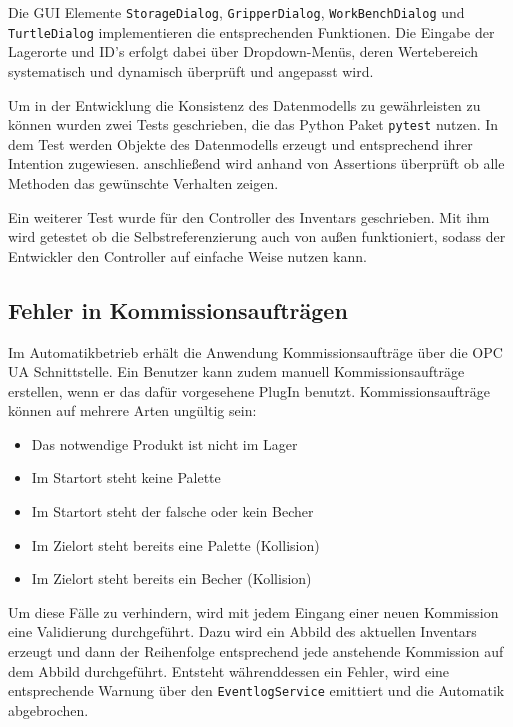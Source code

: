 Die GUI Elemente \verb|StorageDialog|, \verb|GripperDialog|, \verb|WorkBenchDialog| und \\ \verb|TurtleDialog| implementieren 
die entsprechenden Funktionen.
Die Eingabe der Lagerorte und ID's erfolgt dabei über Dropdown-Menüs, deren Wertebereich systematisch und dynamisch überprüft und 
angepasst wird. 

Um in der Entwicklung die Konsistenz des Datenmodells zu gewährleisten zu können wurden zwei Tests geschrieben, die das Python Paket 
\verb|pytest| nutzen. In dem Test werden Objekte des Datenmodells erzeugt und entsprechend ihrer Intention zugewiesen. 
anschließend wird anhand von Assertions überprüft ob alle Methoden das gewünschte Verhalten zeigen. 

Ein weiterer Test wurde für den Controller des Inventars geschrieben. Mit ihm wird getestet ob die Selbstreferenzierung auch von außen funktioniert, 
sodass der Entwickler den Controller auf einfache Weise nutzen kann. 

\subsection{Fehler in Kommissionsaufträgen}

Im Automatikbetrieb erhält die Anwendung Kommissionsaufträge über die OPC UA Schnittstelle.
Ein Benutzer kann zudem manuell Kommissionsaufträge erstellen, wenn er das dafür vorgesehene PlugIn benutzt.
Kommissionsaufträge können auf mehrere Arten ungültig sein: 
\begin{itemize}
    \item Das notwendige Produkt ist nicht im Lager
    \item Im Startort steht keine Palette
    \item Im Startort steht der falsche oder kein Becher
    \item Im Zielort steht bereits eine Palette (Kollision)
    \item Im Zielort steht bereits ein Becher (Kollision)
\end{itemize}
Um diese Fälle zu verhindern, wird mit jedem Eingang einer neuen Kommission eine Validierung durchgeführt.
Dazu wird ein Abbild des aktuellen Inventars erzeugt und dann der Reihenfolge entsprechend jede anstehende Kommission auf dem Abbild durchgeführt. 
Entsteht währenddessen ein Fehler, wird eine entsprechende Warnung über den \verb|EventlogService| emittiert und die 
Automatik abgebrochen.
